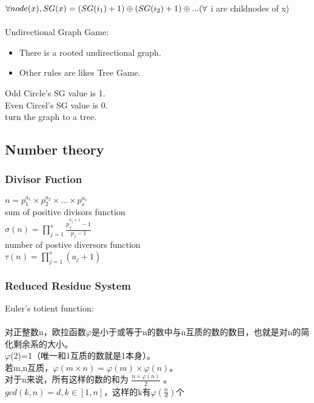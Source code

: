 $\forall node(x),\\
        SG(x)=(SG(i_1)+1)\oplus (SG(i_2)+1)\oplus ... (\forall$ i are childnodes of x)\\
        \\
Undirectional Graph Game:
\begin{itemize}
\item There is a rooted undirectional graph.
\item Other rules are likes Tree Game.
\end{itemize}
Odd Circle's SG value is 1.\\
Even Circel's SG value is 0.\\
turn the graph to a tree.\\

\subsection{Number theory}
\subsubsection{Divisor Fuction}
$n=p_1^{a_1}\times p_2^{a_2}\times ... \times p_s^{a_s}$\\
sum of positive divisors function\\
$\sigma(n)=\prod\limits_{j=1}^s\frac{p_j^{a_j+1}-1}{p_j-1}$\\
number of postive diversors function\\
$\tau(n)=\prod\limits_{j=1}^s(a_j+1)$

\subsubsection{Reduced Residue System}
Euler's totient function:\\
\\
对正整数n，欧拉函数$\varphi$是小于或等于n的数中与n互质的数的数目，也就是对n的简化剩余系的大小。\\
 $\varphi$(2)=1（唯一和1互质的数就是1本身）。\\
若m,n互质，$\varphi (m\times n ) = \varphi (m ) \times \varphi (n )$。\\
对于n来说，所有这样的数的和为 $\frac{n\times\varphi (n )}{2}$ 。\\
$gcd(k,n)=d, k\in [1,n]$，这样的k有$\varphi(\frac{n}{d})个$\\\

